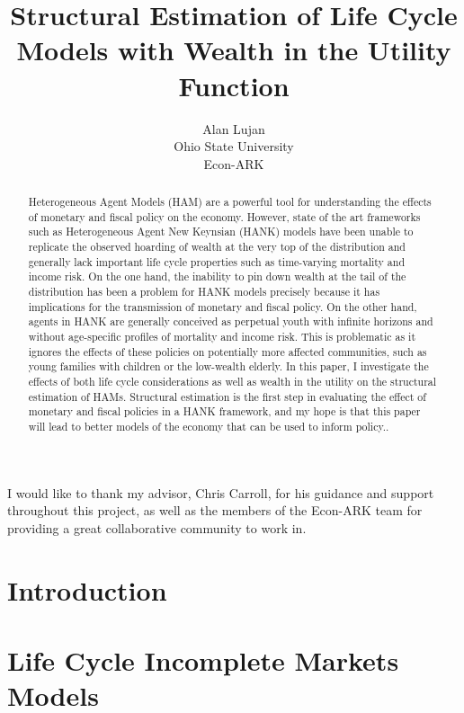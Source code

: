 \documentclass{article}
\title{Structural Estimation of Life Cycle Models with Wealth in the Utility Function}
\date{\displaydate{articleDate}}
\author{Alan Lujan\footnotemark[1]\\
Ohio State University\\Econ-ARK\\}
\begin{document}
\maketitle
{}

\begin{abstract}
Heterogeneous Agent Models (HAM) are a powerful tool for understanding the effects of monetary and fiscal policy on the economy. However, state of the art frameworks such as Heterogeneous Agent New Keynsian (HANK) models have been unable to replicate the observed hoarding of wealth at the very top of the distribution and generally lack important life cycle properties such as time-varying mortality and income risk. On the one hand, the inability to pin down wealth at the tail of the distribution has been a problem for HANK models precisely because it has implications for the transmission of monetary and fiscal policy. On the other hand, agents in HANK are generally conceived as perpetual youth with infinite horizons and without age-specific profiles of mortality and income risk. This is problematic as it ignores the effects of these policies on potentially more affected communities, such as young families with children or the low-wealth elderly. In this paper, I investigate the effects of both life cycle considerations as well as wealth in the utility on the structural estimation of HAMs. Structural estimation is the first step in evaluating the effect of monetary and fiscal policies in a HANK framework, and my hope is that this paper will lead to better models of the economy that can be used to inform policy..
\end{abstract}


I would like to thank my advisor, Chris Carroll, for his guidance and support throughout this project, as well as the members of the Econ-ARK team for providing a great collaborative community to work in.

\section{Introduction}\label{Introduction}

\section{Life Cycle Incomplete Markets Models}\label{Life Cycle Incomplete Markets Models}
\end{document}
